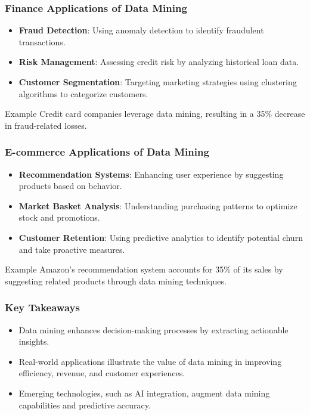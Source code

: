 \documentclass[aspectratio=169]{beamer}
\begin{document}
\begin{frame}[fragile]
    \frametitle{Finance Applications of Data Mining}
    \begin{itemize}
        \item \textbf{Fraud Detection}: Using anomaly detection to identify fraudulent transactions.
        \item \textbf{Risk Management}: Assessing credit risk by analyzing historical loan data.
        \item \textbf{Customer Segmentation}: Targeting marketing strategies using clustering algorithms to categorize customers.
    \end{itemize}
    \begin{block}{Example}
        Credit card companies leverage data mining, resulting in a 35\% decrease in fraud-related losses.
    \end{block}
\end{frame}

\begin{frame}[fragile]
    \frametitle{E-commerce Applications of Data Mining}
    \begin{itemize}
        \item \textbf{Recommendation Systems}: Enhancing user experience by suggesting products based on behavior.
        \item \textbf{Market Basket Analysis}: Understanding purchasing patterns to optimize stock and promotions.
        \item \textbf{Customer Retention}: Using predictive analytics to identify potential churn and take proactive measures.
    \end{itemize}
    \begin{block}{Example}
        Amazon's recommendation system accounts for 35\% of its sales by suggesting related products through data mining techniques.
    \end{block}
\end{frame}

\begin{frame}[fragile]
    \frametitle{Key Takeaways}
    \begin{itemize}
        \item Data mining enhances decision-making processes by extracting actionable insights.
        \item Real-world applications illustrate the value of data mining in improving efficiency, revenue, and customer experiences.
        \item Emerging technologies, such as AI integration, augment data mining capabilities and predictive accuracy.
    \end{itemize}
\end{frame}
\end{document}
